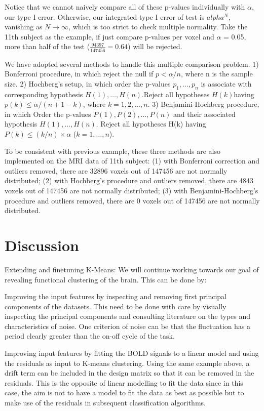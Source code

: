 \documentclass[11pt]{article}
\begin{document}
Notice that we cannot naively compare all of these p-values individually with
$\alpha$, our type I error. Otherwise, our integrated type I error of test is
$alpha^N$, vanishing as $N \rightarrow \infty$, which is too strict to check
multiple normality. Take the 11th subject as the example, if just compare
p-values per voxel and $\alpha$ = 0.05, more than half of the test
($\frac{94397}{147456} =0.64$) will be rejected.

We have adopted several methods to handle this multiple comparison problem. 1)
Bonferroni procedure, in which reject the null if $p< \alpha/n$, where n is the
sample size. 2) Hochberg’s setup, in which order the p-values $p_1,\dots,p_n$ is
associate with corresponding hypothesis $H(1), \dots, H(n)$.Reject all
hypotheses $H(k) $having $p(k)\leq \alpha/(n+1-k)$, where $ k=1,2,\dots,n$. 3)
Benjamini-Hochberg procedure, in which Order the p-values $P(1),P(2),\dots,P(n)$
and their associated hypothesis $H(1),\dots,H(n)$. Reject all hypotheses H(k)
having $P(k) \leq (k/n)\times \alpha $ ($k=1,\dots ,n$).

To be consistent with previous example, these three methods are also implemented
on the MRI data of 11th subject: (1) with Bonferroni correction and outliers
removed, there are 32896 voxels out of 147456 are not normally distributed; (2)
with Hochberg's procedure and outliers removed, there are 4843 voxels out of
147456 are not normally distributed; (3) with Benjamini-Hochberg's procedure and
outliers removed, there are 0 voxels out of 147456 are not normally distributed.


\section{Discussion}

Extending and finetuning K-Means: We will continue working towards our goal of
revealing functional clustering of the brain. This can be done by:
 
Improving the input features by inspecting and removing first principal
components of the datasets. This need to be done with care by visually
inspecting the principal components and consulting literature on the types and
characteristics of noise. One criterion of noise can be that the fluctuation has
a period clearly greater than the on-off cycle of the task. 

Improving input features by fitting the BOLD signals to a linear model and using
the residuals as input to K-means clustering. Using the same example above, a
drift term can be included in the design matrix so that it can be removed in the
residuals. This is the opposite of linear modelling to fit the data since in
this case, the aim is not to have a model to fit the data as best as possible
but to make use of the residuals in subsequent classification algorithms.
\end{document}
